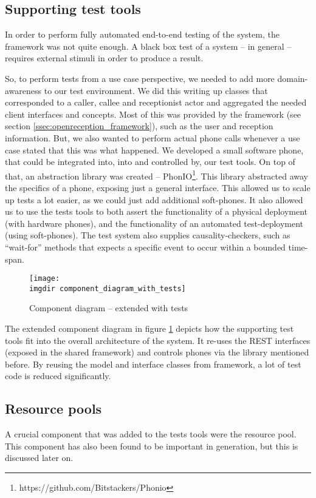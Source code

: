 \subsection{Supporting test tools}
\label{ssec:supporting-test-tools}
In order to perform fully automated end-to-end testing of the system, the framework was not quite enough. A black box test of a system -- in general -- requires external stimuli in order to produce a result.\medskip

\noindent So, to perform tests from a use case perspective, we needed to add more domain-awareness to our test environment. We did this writing up classes that corresponded to a caller, callee and receptionist actor and aggregated the needed client interfaces and concepts. Most of this was provided by the framework (see section \ref{ssec:openreception_framework}), such as the user and reception information. But, we also wanted to perform actual phone calls whenever a use case stated that this was what happened. We developed a small software phone, that could be integrated into, into and controlled by, our test tools. On top of that, an abstraction library was created -- PhonIO\footnote{https://github.com/Bitstackers/Phonio}. This library abstracted away the specifics of a phone, exposing just a general interface. This allowed us to scale up tests a lot easier, as we could just add additional soft-phones. It also allowed us to use the tests tools to both assert the functionality of a physical deployment (with hardware phones), and the functionality of an automated test-deployment (using soft-phones). The test system also supplies causality-checkers, such as ``wait-for'' methods that expects a specific event to occur within a bounded time-span.\medskip
\begin{figure}[!htbp]
\centering
\texttt{[image: \\imgdir component\_diagram\_with\_tests]}
\caption{Component diagram -- extended with tests}
\label{fig:component_diagram_with_tests}
\end{figure}The extended component diagram in figure \ref{fig:component_diagram_with_tests} depicts how the supporting test tools fit into the overall architecture of the system. It re-uses the REST interfaces (exposed in the shared framework) and controls phones via the library mentioned before. By reusing the model and interface classes from framework, a lot of test code is reduced significantly.
\subsection{Resource pools}
\label{ssec:resource-pools}
\noindent A crucial component that was added to the tests tools were the resource pool. This component has also been found to be important in generation, but this is discussed later on.\medskip


